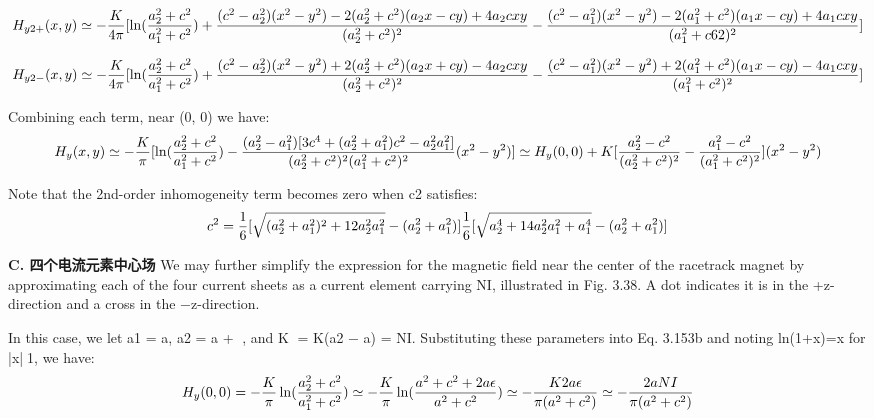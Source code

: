 $$
H_{y2+}(x,y)\simeq-\frac{K}{4\pi}[\ln(\frac{a_{2}^{2}+c^{2}}{a_{1}^{2}+c^{2}})+\frac{(c^{2}-a_{2}^{2})(x^{2}-y^{2})-2(a_{2}^{2}+c^{2})(a_{2}x-cy)+4a_{2}cxy}{(a_{2}^{2}+c^{2})^{2}}\\
-\frac{(c^{2}-a_{1}^{2})(x^{2}-y^{2})-2(a_{1}^{2}+c^{2})(a_{1}x-cy)+4a_{1}cxy}{(a_{1}^{2}+c6{2})^{2}}]\\%
$$

$$
H_{y2-}(x,y)\simeq-\frac{K}{4\pi}[\ln(\frac{a_{2}^{2}+c^{2}}{a_{1}^{2}+c^{2}})+\frac{(c^{2}-a_{2}^{2})(x^{2}-y^{2})+2(a_{2}^{2}+c^{2})(a_{2}x+cy)-4a_{2}cxy}{(a_{2}^{2}+c^{2})^{2}}\\
-\frac{(c^{2}-a_{1}^{2})(x^{2}-y^{2})+2(a_{1}^{2}+c^{2})(a_{1}x-cy)-4a_{1}cxy}{(a_{1}^{2}+c^{2})^{2}}]\\%
$$

Combining each term, near (0, 0) we have:
$$
H_{y}(x,y)\simeq-\frac{K}{\pi}[\ln(\frac{a_{2}^{2}+c^{2}}{a_{1}^{2}+c^{2}})-\frac{(a_{2}^{2}-a_{1}^{2})[3c^{4}+(a_{2}^{2}+a_{1}^{2})c^{2}-a_{2}^{2}a_{1}^{2}]}{(a_{2}^{2}+c^{2})^{2}(a_{1}^{2}+c^{2})^{2}}(x^{2}-y^{2})]\\
\simeq H_{y}(0,0)+K[\frac{a_{2}^{2}-c^{2}}{(a_{2}^{2}+c^{2})^{2}}-\frac{a_{1}^{2}-c^{2}}{(a_{1}^{2}+c^{2})^{2}}](x^{2}-y^{2})\\%
$$

Note that the 2nd-order inhomogeneity term becomes zero when c2 satisfies:
$$
c^{2}=\frac{1}{6}[\sqrt{(a_{2}^{2}+a_{1}^{2})^{2}+12a_{2}^{2}a_{1}^{2}}-(a_{2}^{2}+a_{1}^{2})]\\
\frac{1}{6}[\sqrt{a_{2}^{4}+14a_{2}^{2}a_{1}^{2}+a_{1}^{4}}-(a_{2}^{2}+a_{1}^{2})]\\%
$$

\textbf{C. 四个电流元素中心场}
We may further simplify the expression for the magnetic field near the center
of the racetrack magnet by approximating each of the four current sheets as a
current element carrying NI, illustrated in Fig. 3.38. A dot indicates it is in the
+z-direction and a cross in the −z-direction.

In this case, we let a1 = a, a2 = a + , and K = K(a2 − a) = NI. Substituting
these parameters into Eq. 3.153b and noting ln(1+x)=x for |x|1, we have:
$$
H_{y}(0,0)=-\frac{K}{\pi}\ln(\frac{a_{2}^{2}+c^{2}}{a_{1}^{2}+c^{2}})\simeq-\frac{K}{\pi}\ln(\frac{a^{2}+c^{2}+2a\epsilon}{a^{2}+c^{2}})\\
\simeq-\frac{K2a\epsilon}{\pi(a^{2}+c^{2})}\simeq-\frac{2aNI}{\pi(a^{2}+c^{2})}\\%
$$

